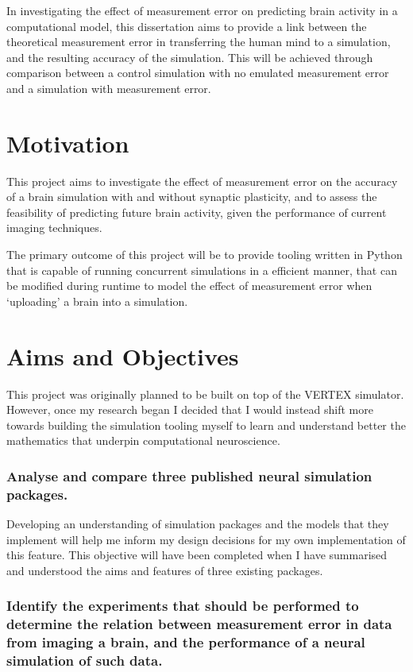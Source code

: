 In investigating the effect of measurement error on predicting brain activity in
a computational model, this dissertation aims to provide a link between the
theoretical measurement error in transferring the human mind to a simulation,
and the resulting accuracy of the simulation. This will be achieved through
comparison between a control simulation with no emulated measurement error and a
simulation with measurement error. 

\section{Motivation}

This project aims to investigate the effect of measurement error on the accuracy
of a brain simulation with and without synaptic plasticity, and to assess the
feasibility of predicting future brain activity, given the performance of
current imaging techniques.

The primary outcome of this project will be to provide tooling written in Python
that is capable of running concurrent simulations in a efficient manner, that can be modified during runtime to model the effect of measurement
error when `uploading' a brain into a simulation.

\section{Aims and Objectives}

This project was originally planned to be built on top of the VERTEX simulator.
However, once my research began I decided that I would instead shift more
towards building the simulation tooling myself to learn and understand better
the mathematics that underpin computational neuroscience.

\subsubsection{Analyse and compare three published neural simulation packages.}

Developing an understanding of simulation packages and the models that they
implement will help me inform my design decisions for my own implementation of
this feature. This objective will have been completed when I have summarised and
understood the aims and features of three existing packages.


\subsubsection{Identify the experiments that should be performed to determine
      the relation between measurement error in data from imaging a brain, and the
      performance of a neural simulation of such data.}

